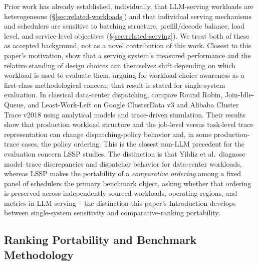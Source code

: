 Prior work has already established, individually, that LLM-serving
workloads are heterogeneous (\S\ref{sec:related-workloads}) and that
individual serving mechanisms and schedulers are sensitive to batching
structure, prefill/decode balance, load level, and service-level
objectives (\S\ref{sec:related-serving}). We treat both of these as accepted
background, not as a novel contribution of this work. Closest to this
paper's motivation, \citet{papaioannou2024workload} show that a serving
system's measured performance and the relative standing of design choices
can themselves shift depending on which workload is used to evaluate them,
arguing for workload-choice awareness as a first-class methodological
concern; that result is stated for single-system evaluation. In classical
data-center dispatching, \citet{yildiz2026dispatching} compare Round Robin,
Join-Idle-Queue, and Least-Work-Left on Google ClusterData v3 and Alibaba
Cluster Trace v2018 using analytical models and trace-driven simulation.
Their results show that production workload structure and the job-level
versus task-level trace representation can change dispatching-policy
behavior and, in some production-trace cases, the policy ordering. This is
the closest non-LLM precedent for the evaluation concern LSSP studies. The
distinction is that Yildiz et al.\ diagnose model--trace discrepancies and
dispatcher behavior for data-center workloads, whereas LSSP makes the
portability of a \emph{comparative ordering} among a fixed panel of
schedulers the primary benchmark object, asking whether that ordering is
preserved across independently sourced workloads, operating regions, and
metrics in LLM serving -- the distinction this paper's Introduction
develops between single-system sensitivity and comparative-ranking
portability.

\subsection{Ranking Portability and Benchmark Methodology}
\label{sec:related-methodology}

